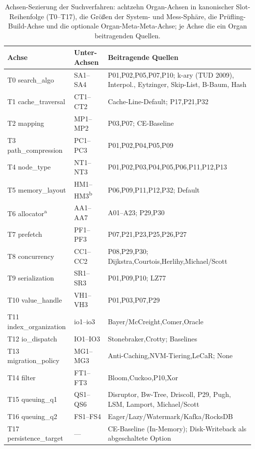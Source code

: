 \begin{nurkurz}
\begin{table}[!htbp]
  \caption{Achsen-Sezierung der Suchverfahren: achtzehn Organ-Achsen in kanonischer
  Slot-Reihenfolge (T0--T17), die Größen der System- und Mess-Sphäre, die
  Prüfling-Build-Achse und die optionale Organ-Meta-Meta-Achse; je Achse die ein Organ beitragenden Quellen.}\label{tab:axes-overview}
  \centering\footnotesize
  \begin{tabular}{@{}l l p{6.8cm}@{}}
    \toprule
    \textbf{Achse} & \textbf{Unter-Achsen} & \textbf{Beitragende Quellen} \\
    \midrule
    T0 search\_algo & SA1--SA4 & P01,P02,P05,P07,P10; k-ary (TUD 2009), Interpol., Eytzinger, Skip-List, B-Baum, Hash \\
    T1 cache\_traversal & CT1--CT2 & Cache-Line-Default; P17,P21,P32 \\
    T2 mapping & MP1--MP2 & P03,P07; CE-Baseline \\
    T3 path\_compression & PC1--PC3 & P01,P02,P04,P05,P09 \\
    T4 node\_type & NT1--NT3 & P01,P02,P03,P04,P05,P06,P11,P12,P13 \\
    T5 memory\_layout & HM1--HM3\textsuperscript{b} & P06,P09,P11,P12,P32; Default \\
    T6 allocator\textsuperscript{a} & AA1--AA7 & A01--A23; P29,P30 \\
    T7 prefetch & PF1--PF3 & P07,P21,P23,P25,P26,P27 \\
    T8 concurrency & CC1--CC2 & P08,P29,P30; Dijkstra,Courtois,Herlihy,Michael/Scott \\
    T9 serialization & SR1--SR3 & P01,P09,P10; LZ77 \\
    \midrule
    T10 value\_handle & VH1--VH3 & P01,P03,P07,P29 \\
    T11 index\_organization & io1--io3 & Bayer/McCreight,Comer,Oracle \\
    T12 io\_dispatch & IO1--IO3 & Stonebraker,Crotty; Baselines \\
    T13 migration\_policy & MG1--MG3 & Anti-Caching,NVM-Tiering,LeCaR\@; None \\
    T14 filter & FT1--FT3 & Bloom,Cuckoo,P10,Xor \\
    T15 queuing\_q1 & QS1--QS6 & Disruptor, Bw-Tree, Driscoll, P29, Pugh, LSM, Lamport, Michael/Scott \\
    T16 queuing\_q2 & FS1--FS4 & Eager/Lazy/Watermark/Kafka/RocksDB \\
    T17 persistence\_target & --- & CE-Baseline (In-Memory); Disk-Writeback als abgeschaltete Option \\

\end{tabular}
\end{table}
\end{nurkurz}
